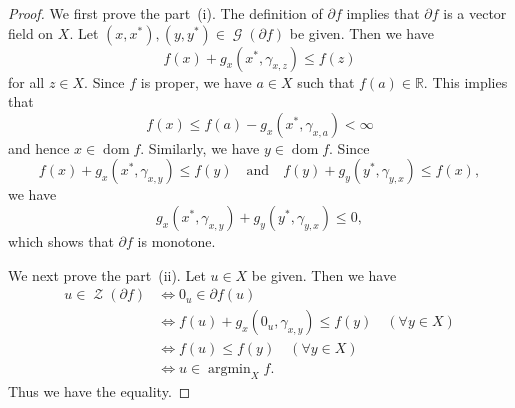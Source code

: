 \documentclass[draft]{amsart}
\numberwithin{equation}{section}
\def\R{\mathbb R}
\DeclareMathOperator*{\Argmin}{argmin}
\DeclareMathOperator{\Gra}{\mathcal{G}}
\DeclareMathOperator{\Dom}{dom}
\DeclareMathOperator{\Zer}{\mathcal{Z}}
\theoremstyle{plain}
\theoremstyle{definition}
\theoremstyle{remark}
\begin{document}
\begin{proof}
We first prove the part~(i). 
The definition of $\partial f$ implies that $\partial f$ 
is a vector field on $X$. 
Let $(x,x^*), (y,y^*)\in \Gra(\partial f)$ be given. 
Then we have 
\[
 f(x) + g_x(x^*, \gamma_{x,z}) \leq f(z) 
\]
for all $z\in X$. Since $f$ is proper, we have $a\in X$ such that 
$f(a)\in \R$. This implies that 
\[
 f(x) \leq f(a) - g_x(x^*, \gamma_{x,a}) < \infty 
\]
and hence $x \in \Dom f$. Similarly, we have $y\in \Dom f$. 
Since 
\[
 f(x) + g_x(x^*, \gamma_{x,y}) \leq f(y) 
 \quad \textrm{and} \quad 
 f(y) + g_y(y^*, \gamma_{y,x}) \leq f(x), 
\]
we have 
\[
 g_x(x^*, \gamma_{x,y}) + g_y(y^*, \gamma_{y,x}) \leq 0, 
\]
which shows that $\partial f$ is monotone. 

We next prove the part~(ii). Let $u\in X$ be given. Then we have 
\begin{align*}
 u\in \Zer (\partial f)
 &\Longleftrightarrow 
 0_u\in \partial f (u) \\
 &\Longleftrightarrow 
 f(u) + g_x(0_u, \gamma_{x,y}) \leq f(y) \quad (\forall y\in X) \\
 &\Longleftrightarrow 
 f(u) \leq f(y) \quad (\forall y\in X) \\
 &\Longleftrightarrow 
 u\in \Argmin_X f. 
\end{align*}
Thus we have the equality. 


\end{proof}
\end{document}

